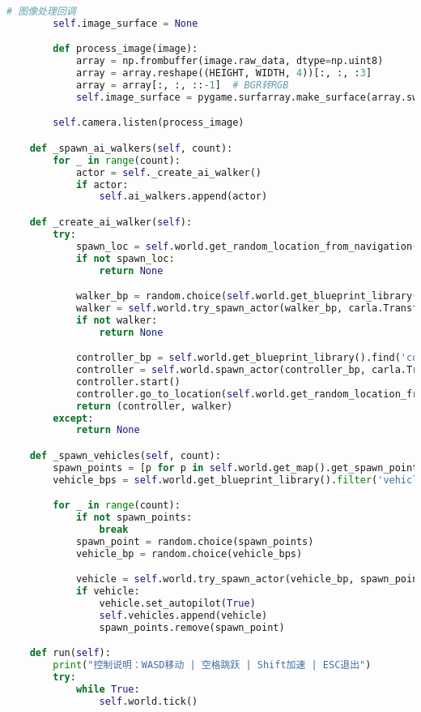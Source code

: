 \begin{lstlisting}[language=Python]
        # 图像处理回调
        self.image_surface = None

        def process_image(image):
            array = np.frombuffer(image.raw_data, dtype=np.uint8)
            array = array.reshape((HEIGHT, WIDTH, 4))[:, :, :3]
            array = array[:, :, ::-1]  # BGR转RGB
            self.image_surface = pygame.surfarray.make_surface(array.swapaxes(0, 1))

        self.camera.listen(process_image)

    def _spawn_ai_walkers(self, count):
        for _ in range(count):
            actor = self._create_ai_walker()
            if actor:
                self.ai_walkers.append(actor)

    def _create_ai_walker(self):
        try:
            spawn_loc = self.world.get_random_location_from_navigation()
            if not spawn_loc:
                return None

            walker_bp = random.choice(self.world.get_blueprint_library().filter('walker.pedestrian.*'))
            walker = self.world.try_spawn_actor(walker_bp, carla.Transform(spawn_loc))
            if not walker:
                return None

            controller_bp = self.world.get_blueprint_library().find('controller.ai.walker')
            controller = self.world.spawn_actor(controller_bp, carla.Transform(), walker)
            controller.start()
            controller.go_to_location(self.world.get_random_location_from_navigation())
            return (controller, walker)
        except:
            return None

    def _spawn_vehicles(self, count):
        spawn_points = [p for p in self.world.get_map().get_spawn_points() if p.location.z > 0]
        vehicle_bps = self.world.get_blueprint_library().filter('vehicle.*')

        for _ in range(count):
            if not spawn_points:
                break
            spawn_point = random.choice(spawn_points)
            vehicle_bp = random.choice(vehicle_bps)

            vehicle = self.world.try_spawn_actor(vehicle_bp, spawn_point)
            if vehicle:
                vehicle.set_autopilot(True)
                self.vehicles.append(vehicle)
                spawn_points.remove(spawn_point)

    def run(self):
        print("控制说明：WASD移动 | 空格跳跃 | Shift加速 | ESC退出")
        try:
            while True:
                self.world.tick()


\end{lstlisting}
